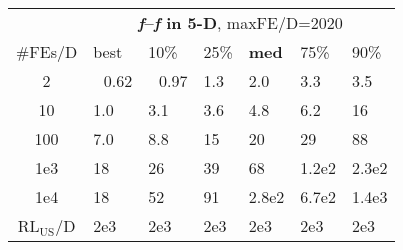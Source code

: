 \begin{tabular}{c|llllll}
 & \multicolumn{6}{|c}{\textbf{\textit{f}\raisebox{-0.35ex}{1}--\textit{f}\raisebox{-0.35ex}{24} in 5-D}, maxFE/D=2020}\\
\#FEs/D & best & 10\% & 25\% & \textbf{med} & 75\% & 90\%\\
2 & ~\,0.62 & ~\,0.97 & \hspace*{1ex}1.3 & \hspace*{1ex}2.0 & \hspace*{1ex}3.3 & \hspace*{1ex}3.5\\
10 & \hspace*{1ex}1.0 & \hspace*{1ex}3.1 & \hspace*{1ex}3.6 & \hspace*{1ex}4.8 & \hspace*{1ex}6.2 & 16\\
100 & \hspace*{1ex}7.0 & \hspace*{1ex}8.8 & 15 & 20 & 29 & 88\\
1e3 & 18 & 26 & 39 & 68 & 1.2e2 & 2.3e2\\
1e4 & 18 & 52 & 91 & 2.8e2 & 6.7e2 & 1.4e3\\
$\text{RL}_{\text{US}}$/D & 2e3 & 2e3 & 2e3 & 2e3 & 2e3 & 2e3
\end{tabular}
